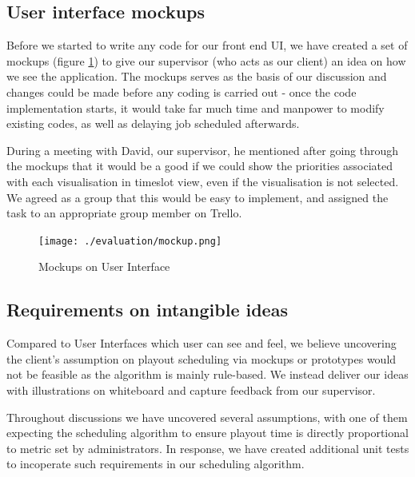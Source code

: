 \documentclass[a4paper]{article}
\begin{document}
\subsection{User interface mockups}
Before we started to write any code for our front end UI, we have created
a set of mockups (figure \ref{fig:mockup}) to give our supervisor (who acts 
as our client) an idea on how we see the application. The mockups serves as the basis
of our discussion and changes could be made before any coding is carried out -
once the code implementation starts, it would take far much time and manpower to 
modify existing codes, as well as delaying job scheduled afterwards.

During a meeting with David, our supervisor, he mentioned after going 
through the mockups that it would be a good if we could show the priorities
associated with each visualisation in timeslot view, even if the visualisation
is not selected.
We agreed as a group that this would be easy to implement, and assigned the 
task to an appropriate group member on Trello.

\begin{figure}[H]
   \begin{center}
      \texttt{[image: ./evaluation/mockup.png]}
   \end{center}
   \caption{Mockups on User Interface}
   \label{fig:mockup}
\end{figure}

\subsection{Requirements on intangible ideas}
Compared to User Interfaces which user can see and feel, we believe 
uncovering the client's assumption on playout scheduling via mockups or 
prototypes would not be feasible as the algorithm is mainly rule-based.
We instead deliver our ideas with illustrations on whiteboard and
capture feedback from our supervisor.

Throughout discussions we have uncovered several assumptions, with one of them
expecting the scheduling algorithm to ensure playout time is 
directly proportional to metric set by administrators. In response,
we have created additional unit tests to incoperate such requirements 
in our scheduling algorithm.
\end{document}

